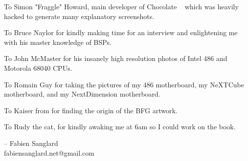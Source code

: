 To Simon "Fraggle" Howard, main developer of Chocolate \doom~ which was heavily hacked to generate many explanatory screenshots.\\
\par
To Bruce Naylor for kindly making time for an interview and enlightening me with his master knowledge of BSPs.\\
\par
To John McMaster for his insanely high resolution photos of Intel 486 and Motorola 68040 CPUs.\\
\par
To Romain Guy for taking the pictures of my 486 motherboard, my NeXTCube motherboard, and my NextDimension motherboard.\\
\par
To Kaiser from  for finding the origin of the BFG artwork.\\
\par
To Rudy the cat, for kindly awaking me at 6am so I could work on the book.\\
\par
-- Fabien Sanglard\\
fabiensanglard.net@gmail.com

